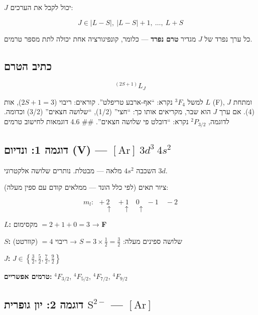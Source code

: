 \documentclass[
  hebrew,
  letterpaper,
  DIV=11,
  numbers=noendperiod]{scrreprt}
\begin{document}
\(J\) יכול לקבל את הערכים:

\[J \in {|L-S|,\ |L-S|+1,\ \ldots,\ L+S}\]

כל ערך נפרד של \(J\) מגדיר \textbf{טרם נפרד} --- כלומר, קונפיגורציה אחת
יכולה לתת מספר טרמים.

\subsection{כתיב הטרם}\label{ux5dbux5eaux5d9ux5d1-ux5d4ux5d8ux5e8ux5dd}

\[^{(2S+1)}L_J\]

למשל \(^3F_4\) נקרא: ``אף-ארבע טריפלט''. קוראים: ריבוי (\(2S+1=3\)), אות
\(L\) (F), ומתחת \(J\) (4). אם ערך \(J\) הוא שבר, מקריאים אותו כך:
``חצי'' (1/2), ``שלושה חצאים'' (3/2) וכדומה. לדוגמה, \(^2P_{3/2}\) נקרא:
``דובלט פי שלושה חצאים''. \#\# 4.6 דוגמאות לחישוב טרמים

\subsection{\texorpdfstring{דוגמה 1: ונדיום (V) ---
\([\text{Ar}]\ 3d^3\ 4s^2\)}{דוגמה 1: ונדיום (V) --- {[}\textbackslash text\{Ar\}{]}\textbackslash{} 3d\^{}3\textbackslash{} 4s\^{}2}}\label{ux5d3ux5d5ux5d2ux5deux5d4-1-ux5d5ux5e0ux5d3ux5d9ux5d5ux5dd-v-textar-3d3-4s2}

השכבה \(4s^2\) מלאה --- מבטלת. נותרים שלושה אלקטרוני \(3d\).

ציור תאים (לפי כלל הונד --- ממלאים קודם עם ספין מעלה):

\[m_l:\ \ +2 \quad +1 \quad 0 \quad -1 \quad -2\]
\[\quad\quad\ \ \uparrow \quad\ \ \uparrow \quad \uparrow \quad\quad\quad\quad\]

\textbf{\(L\):} מקסימום \(= 2+1+0 = 3\) → \textbf{F}

\textbf{\(S\):} שלושה ספינים מעלה:
\(S = 3 \times \frac{1}{2} = \frac{3}{2}\) → ריבוי \(= 4\) (קוורטט)

\textbf{\(J\):}
\(J \in \left\{\frac{3}{2}, \frac{5}{2}, \frac{7}{2}, \frac{9}{2}\right\}\)

\textbf{טרמים אפשריים:} \(^4F_{3/2}\), \(^4F_{5/2}\), \(^4F_{7/2}\),
\(^4F_{9/2}\)

\subsection{\texorpdfstring{דוגמה 2: יון גופרית \(\text{S}^{2-}\) ---
\([\text{Ar}]\)}{דוגמה 2: יון גופרית \textbackslash text\{S\}\^{}\{2-\} --- {[}\textbackslash text\{Ar\}{]}}}\label{ux5d3ux5d5ux5d2ux5deux5d4-2-ux5d9ux5d5ux5df-ux5d2ux5d5ux5e4ux5e8ux5d9ux5ea-texts2--textar}
\end{document}
